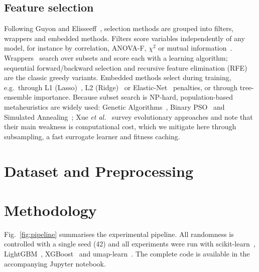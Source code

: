 \subsection{Feature selection}
Following Guyon and Elisseeff~\cite{guyon2003}, selection methods are grouped into filters, wrappers and embedded methods. Filters score variables independently of any model, for instance by correlation, ANOVA-F, $\chi^2$ or mutual information~\cite{peng2005}. Wrappers~\cite{kohavi1997} search over subsets and score each with a learning algorithm; sequential forward/backward selection and recursive feature elimination (RFE)~\cite{guyon2002} are the classic greedy variants. Embedded methods select during training, e.g.\ through L1 (Lasso)~\cite{tibshirani1996}, L2 (Ridge)~\cite{hoerl1970} or Elastic-Net~\cite{zou2005} penalties, or through tree-ensemble importance. Because subset search is NP-hard, population-based metaheuristics are widely used: Genetic Algorithms~\cite{holland1975,goldberg1989,yang1998}, Binary PSO~\cite{kennedy1997} and Simulated Annealing~\cite{kirkpatrick1983}; Xue \emph{et al.}~\cite{xue2016} survey evolutionary approaches and note that their main weakness is computational cost, which we mitigate here through subsampling, a fast surrogate learner and fitness caching.

\section{Dataset and Preprocessing}\label{sec:data}


\section{Methodology}\label{sec:methods}
Fig.~\ref{fig:pipeline} summarises the experimental pipeline. All randomness is controlled with a single seed (42) and all experiments were run with scikit-learn~\cite{pedregosa2011}, LightGBM~\cite{ke2017}, XGBoost~\cite{chen2016xgb} and umap-learn~\cite{mcinnes2018}. The complete code is available in the accompanying Jupyter notebook.

